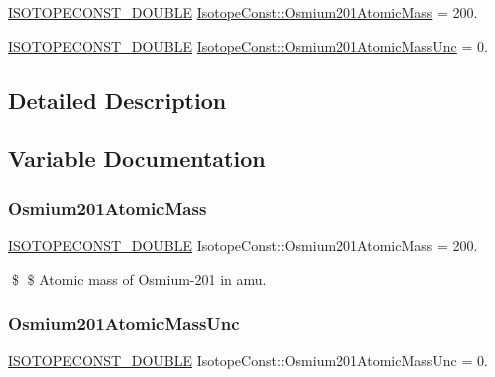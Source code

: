 \begin{DoxyCompactItemize}
\item 
\mbox{\hyperlink{group___isotope_const-_macros_ga8f45a7272ce02c0b4c65c44636ed719a}{I\+S\+O\+T\+O\+P\+E\+C\+O\+N\+S\+T\+\_\+\+D\+O\+U\+B\+LE}} \mbox{\hyperlink{group___isotope_const-_osmium-_os201_ga18a9e7798b6f263810b251e4e9ce104f}{Isotope\+Const\+::\+Osmium201\+Atomic\+Mass}} = 200.
\item 
\mbox{\hyperlink{group___isotope_const-_macros_ga8f45a7272ce02c0b4c65c44636ed719a}{I\+S\+O\+T\+O\+P\+E\+C\+O\+N\+S\+T\+\_\+\+D\+O\+U\+B\+LE}} \mbox{\hyperlink{group___isotope_const-_osmium-_os201_ga89d7bf7a329d3aefd5d1bb5e6d4fe883}{Isotope\+Const\+::\+Osmium201\+Atomic\+Mass\+Unc}} = 0.
\end{DoxyCompactItemize}


\subsection{Detailed Description}


\subsection{Variable Documentation}
\mbox{\label{group___isotope_const-_osmium-_os201_ga18a9e7798b6f263810b251e4e9ce104f}} 
\subsubsection{\texorpdfstring{Osmium201\+Atomic\+Mass}{Osmium201AtomicMass}}
{\footnotesize\ttfamily \mbox{\hyperlink{group___isotope_const-_macros_ga8f45a7272ce02c0b4c65c44636ed719a}{I\+S\+O\+T\+O\+P\+E\+C\+O\+N\+S\+T\+\_\+\+D\+O\+U\+B\+LE}} Isotope\+Const\+::\+Osmium201\+Atomic\+Mass = 200.}

\$ \$ Atomic mass of Osmium-\/201 in amu. \mbox{\label{group___isotope_const-_osmium-_os201_ga89d7bf7a329d3aefd5d1bb5e6d4fe883}} 
\subsubsection{\texorpdfstring{Osmium201\+Atomic\+Mass\+Unc}{Osmium201AtomicMassUnc}}
{\footnotesize\ttfamily \mbox{\hyperlink{group___isotope_const-_macros_ga8f45a7272ce02c0b4c65c44636ed719a}{I\+S\+O\+T\+O\+P\+E\+C\+O\+N\+S\+T\+\_\+\+D\+O\+U\+B\+LE}} Isotope\+Const\+::\+Osmium201\+Atomic\+Mass\+Unc = 0.}

